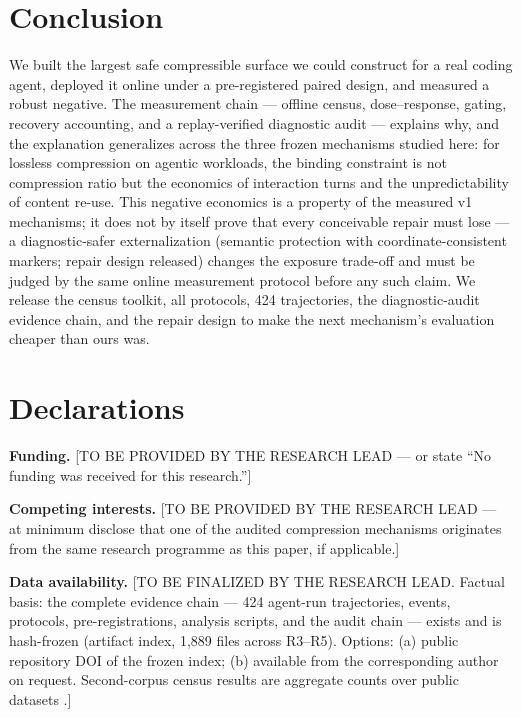 \documentclass[twocolumn]{svjour3}       %
\begin{document}
\section{Conclusion}

We built the largest safe compressible surface we could construct for a real coding
agent, deployed it online under a pre-registered paired design, and measured a robust
negative. The measurement chain --- offline census, dose--response, gating, recovery
accounting, and a replay-verified diagnostic audit --- explains why, and the explanation
generalizes across the three frozen mechanisms studied here: for lossless compression on
agentic workloads, the binding constraint is not compression ratio but the economics of
interaction turns and the unpredictability of content re-use. This negative economics is
a property of the measured v1 mechanisms; it does not by itself prove that every
conceivable repair must lose --- a diagnostic-safer externalization (semantic protection
with coordinate-consistent markers; repair design released) changes the exposure
trade-off and must be judged by the same online measurement protocol before any such
claim. We release the census toolkit, all protocols, 424 trajectories, the
diagnostic-audit evidence chain, and the repair design to make the next mechanism's
evaluation cheaper than ours was.

\section*{Declarations}

\textbf{Funding.} [TO BE PROVIDED BY THE RESEARCH LEAD --- or state ``No funding was
received for this research.'']

\textbf{Competing interests.} [TO BE PROVIDED BY THE RESEARCH LEAD --- at minimum
disclose that one of the audited compression mechanisms originates from the same
research programme as this paper, if applicable.]

\textbf{Data availability.} [TO BE FINALIZED BY THE RESEARCH LEAD. Factual basis: the
complete evidence chain --- 424 agent-run trajectories, events, protocols, pre-registrations,
analysis scripts, and the audit chain --- exists and is hash-frozen (artifact index,
1{,}889 files across R3--R5). Options: (a) public repository DOI of the frozen index;
(b) available from the corresponding author on request. Second-corpus census results are
aggregate counts over public datasets \cite{thoughtworks2026,openswetraces2026}.]
\end{document}
